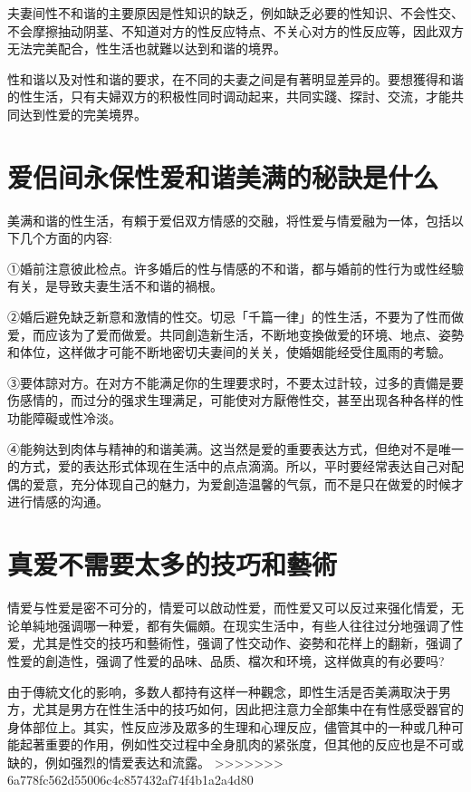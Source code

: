\documentclass[12pt,UTF8]{ctexbook}
\begin{document}
夫妻间性不和谐的主要原因是性知识的缺乏，例如缺乏必要的性知识、不会性交、不会摩擦抽动阴茎、不知道对方的性反应特点、不关心对方的性反应等，因此双方无法完美配合，性生活也就難以达到和谐的境界。

性和谐以及对性和谐的要求，在不同的夫妻之间是有著明显差异的。要想獲得和谐的性生活，只有夫婦双方的积极性同时调动起来，共同实踐、探討、交流，才能共同达到性爱的完美境界。

\section{爱侣间永保性爱和谐美满的秘訣是什么}

美满和谐的性生活，有賴于爱侣双方情感的交融，将性爱与情爱融为一体，包括以下几个方面的内容:

①婚前注意彼此检点。许多婚后的性与情感的不和谐，都与婚前的性行为或性经驗有关，是导致夫妻生活不和谐的禍根。

②婚后避免缺乏新意和激情的性交。切忌「千篇一律」的性生活，不要为了性而做爱，而应该为了爱而做爱。共同創造新生活，不断地变換做爱的环境、地点、姿勢和体位，这样做才可能不断地密切夫妻间的关关，使婚姻能经受住風雨的考驗。

③要体諒对方。在对方不能满足你的生理要求时，不要太过計较，过多的責備是要伤感情的，而过分的强求生理满足，可能使对方厭倦性交，甚至出现各种各样的性功能障礙或性冷淡。

④能夠达到肉体与精神的和谐美满。这当然是爱的重要表达方式，但绝对不是唯一的方式，爱的表达形式体现在生活中的点点滴滴。所以，平时要经常表达自己对配偶的爱意，充分体现自己的魅力，为爱創造温馨的气氛，而不是只在做爱的时候才进行情感的沟通。

\section{真爱不需要太多的技巧和藝術}

情爱与性爱是密不可分的，情爱可以啟动性爱，而性爱又可以反过来强化情爱，无论单純地强调哪一种爱，都有失偏頗。在现实生活中，有些人往往过分地强调了性爱，尤其是性交的技巧和藝術性，强调了性交动作、姿勢和花样上的翻新，强调了性爱的創造性，强调了性爱的品味、品质、檔次和环境，这样做真的有必要吗?

由于傳統文化的影响，多数人都持有这样一种觀念，即性生活是否美满取決于男方，尤其是男方在性生活中的技巧如何，因此把注意力全部集中在有性感受器官的身体部位上。其实，性反应涉及眾多的生理和心理反应，儘管其中的一种或几种可能起著重要的作用，例如性交过程中全身肌肉的紧张度，但其他的反应也是不可或缺的，例如强烈的情爱表达和流露。
>>>>>>> 6a778fc562d55006c4c857432af74f4b1a2a4d80
\end{document}
